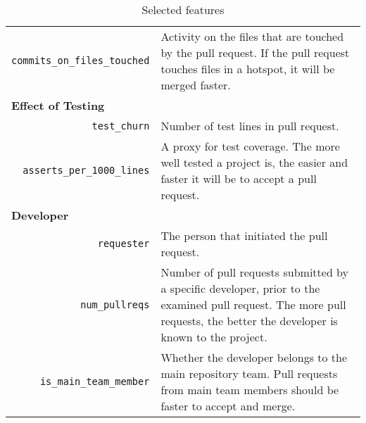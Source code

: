 \documentclass{sig-alternate}
\begin{document}
\begin{table*}
\begin{tabular}{rp{25em}}
    \texttt{commits\_on\_files\_touched} & Activity on the files that are
    touched by the pull request. If the pull request touches files in a hotspot,
    it will be merged faster.\\
    
    \multicolumn{2}{l}{\bf{Effect of Testing}}\\

    \texttt{test\_churn} & Number of test lines in pull request. \\

    \texttt{asserts\_per\_1000\_lines} & A proxy for test coverage. The
    more well tested a project is, the easier and faster it will be to accept 
    a pull request.\\
    
    \multicolumn{2}{l}{\bf{Developer}}\\
    
    \texttt{requester} & The person that initiated the pull request.\\

    \texttt{num\_pullreqs} & Number of pull requests submitted by a specific
    developer, prior to the examined pull request. The more pull requests, the
    better the developer is known to the project.\\

    \texttt{is\_main\_team\_member} & Whether the developer belongs to the
    main repository team. Pull requests from main team members should be
    faster to accept and merge.\\
    \hline
  \end{tabular}
  \caption{Selected features}
  \label{tab:features}
\end{table*}
\end{document}

